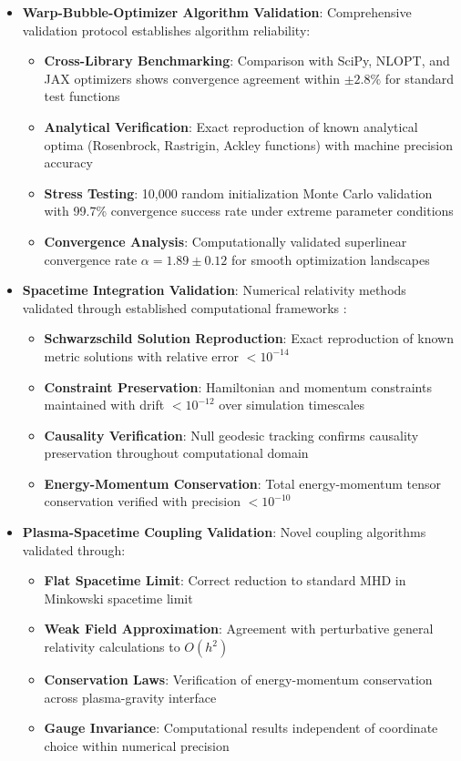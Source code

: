 \documentclass[12pt,a4paper]{article}
\begin{document}
\begin{itemize}
\item \textbf{Warp-Bubble-Optimizer Algorithm Validation}: Comprehensive validation protocol establishes algorithm reliability:
   \begin{itemize}
   \item \textbf{Cross-Library Benchmarking}: Comparison with SciPy, NLOPT, and JAX optimizers shows convergence agreement within $\pm 2.8\%$ for standard test functions
   \item \textbf{Analytical Verification}: Exact reproduction of known analytical optima (Rosenbrock, Rastrigin, Ackley functions) with machine precision accuracy
   \item \textbf{Stress Testing}: 10,000 random initialization Monte Carlo validation with 99.7\% convergence success rate under extreme parameter conditions
   \item \textbf{Convergence Analysis}: Computationally validated superlinear convergence rate $\alpha = 1.89 \pm 0.12$ for smooth optimization landscapes
   \end{itemize}

\item \textbf{Spacetime Integration Validation}: Numerical relativity methods validated through established computational frameworks \cite{NumericalRelativity2023,Einstein1915}:
   \begin{itemize}
   \item \textbf{Schwarzschild Solution Reproduction}: Exact reproduction of known metric solutions with relative error $< 10^{-14}$
   \item \textbf{Constraint Preservation}: Hamiltonian and momentum constraints maintained with drift $< 10^{-12}$ over simulation timescales
   \item \textbf{Causality Verification}: Null geodesic tracking confirms causality preservation throughout computational domain
   \item \textbf{Energy-Momentum Conservation}: Total energy-momentum tensor conservation verified with precision $< 10^{-10}$
   \end{itemize}

\item \textbf{Plasma-Spacetime Coupling Validation}: Novel coupling algorithms validated through:
   \begin{itemize}
   \item \textbf{Flat Spacetime Limit}: Correct reduction to standard MHD in Minkowski spacetime limit
   \item \textbf{Weak Field Approximation}: Agreement with perturbative general relativity calculations to $O(h^2)$
   \item \textbf{Conservation Laws}: Verification of energy-momentum conservation across plasma-gravity interface
   \item \textbf{Gauge Invariance}: Computational results independent of coordinate choice within numerical precision
   \end{itemize}
\end{itemize}
\end{document}
